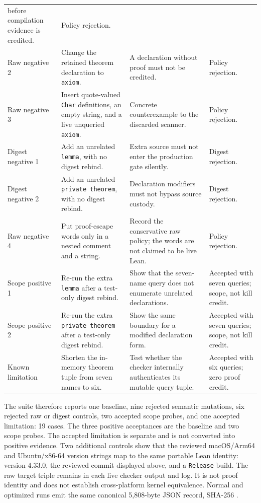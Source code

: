\documentclass[11pt]{article}
\theoremstyle{definition}
\begin{document}
\begin{longtable}{L{0.13\textwidth}L{0.28\textwidth}L{0.34\textwidth}L{0.17\textwidth}}
before compilation evidence is credited. & Policy rejection. \\
Raw negative 2 & Change the retained theorem declaration to \texttt{axiom}. & A declaration without
proof must not be credited. & Policy rejection. \\
Raw negative 3 & Insert quote-valued \texttt{Char} definitions, an empty string, and a live unqueried
\texttt{axiom}. & Concrete counterexample to the discarded scanner. & Policy rejection. \\
Digest negative 1 & Add an unrelated \texttt{lemma}, with no digest rebind. & Extra source must not
enter the production gate silently. & Digest rejection. \\
Digest negative 2 & Add an unrelated \texttt{private theorem}, with no digest rebind. & Declaration
modifiers must not bypass source custody. & Digest rejection. \\
Raw negative 4 & Put proof-escape words only in a nested comment and a string. & Record the
conservative raw policy; the words are not claimed to be live Lean. & Policy rejection. \\
\midrule
Scope positive 1 & Re-run the extra \texttt{lemma} after a test-only digest rebind. & Show that the
seven-name query does not enumerate unrelated declarations. & Accepted with seven queries; scope,
not kill credit. \\
Scope positive 2 & Re-run the extra \texttt{private theorem} after a test-only digest rebind. & Show
the same boundary for a modified declaration form. & Accepted with seven queries; scope, not kill
credit. \\
Known limitation & Shorten the in-memory theorem tuple from seven names to six. & Test whether the
checker internally authenticates its mutable query tuple. & Accepted with six queries; zero proof
credit. \\
\bottomrule
\end{longtable}
\endgroup

The suite therefore reports one baseline, nine rejected semantic mutations, six rejected raw or
digest controls, two accepted scope probes, and one accepted limitation: 19 cases.  The three
positive acceptances are the baseline and two scope probes.  The accepted limitation is separate
and is not converted into positive evidence.  Two additional controls show that the reviewed
macOS/Arm64 and Ubuntu/x86-64 version strings map to the same portable Lean identity: version
4.33.0, the reviewed commit displayed above, and a \texttt{Release} build.  The raw target triple
remains in each live checker output and log.  It is not proof identity and does not establish
cross-platform kernel equivalence.  Normal and optimized runs emit the same canonical 5,808-byte
JSON record, SHA-256
.
\end{document}
